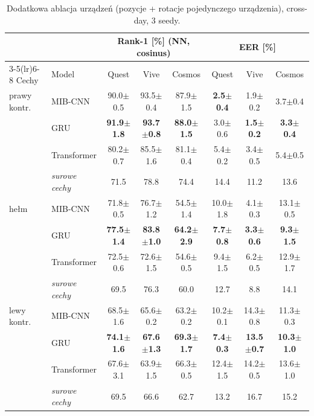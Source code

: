\begin{table}[H]\centering\small
\caption{Dodatkowa ablacja urządzeń (pozycje + rotacje pojedynczego urządzenia), cross-day, 3 seedy.}\label{tab:abl_dev}
\begin{tabular}{llcccccc}
\toprule
 & & \multicolumn{3}{c}{Rank-1 [\%] (NN, cosinus)} & \multicolumn{3}{c}{EER [\%]} \\
\cmidrule(lr){3-5}\cmidrule(lr){6-8}
Cechy & Model & Quest & Vive & Cosmos & Quest & Vive & Cosmos \\
\midrule
prawy kontr. & MIB-CNN & 90.0$\pm$0.5 & 93.5$\pm$0.4 & 87.9$\pm$1.5 & \textbf{2.5$\pm$0.4} & 1.9$\pm$0.2 & 3.7$\pm$0.4 \\
 & GRU & \textbf{91.9$\pm$1.8} & \textbf{93.7$\pm$0.8} & \textbf{88.0$\pm$1.5} & 3.0$\pm$0.6 & \textbf{1.5$\pm$0.2} & \textbf{3.3$\pm$0.4} \\
 & Transformer & 80.2$\pm$0.7 & 85.5$\pm$1.6 & 81.1$\pm$0.4 & 5.4$\pm$0.2 & 3.4$\pm$0.5 & 5.4$\pm$0.5 \\
 & \textit{surowe cechy} & 71.5 & 78.8 & 74.4 & 14.4 & 11.2 & 13.6 \\
\midrule
hełm & MIB-CNN & 71.8$\pm$0.5 & 76.7$\pm$1.2 & 54.5$\pm$1.4 & 10.0$\pm$1.8 & 4.1$\pm$0.3 & 13.1$\pm$0.5 \\
 & GRU & \textbf{77.5$\pm$1.4} & \textbf{83.8$\pm$1.0} & \textbf{64.2$\pm$2.9} & \textbf{7.7$\pm$0.8} & \textbf{3.3$\pm$0.6} & \textbf{9.3$\pm$1.5} \\
 & Transformer & 72.5$\pm$0.6 & 72.6$\pm$1.5 & 54.6$\pm$0.5 & 9.4$\pm$1.5 & 6.2$\pm$0.5 & 12.9$\pm$1.7 \\
 & \textit{surowe cechy} & 69.5 & 76.3 & 60.0 & 12.7 & 8.8 & 14.1 \\
\midrule
lewy kontr. & MIB-CNN & 68.5$\pm$1.6 & 65.6$\pm$0.2 & 63.2$\pm$0.2 & 10.2$\pm$0.1 & 14.3$\pm$0.8 & 11.3$\pm$0.3 \\
 & GRU & \textbf{74.1$\pm$1.6} & \textbf{67.6$\pm$1.3} & \textbf{69.3$\pm$1.7} & \textbf{7.4$\pm$0.3} & \textbf{13.5$\pm$0.7} & \textbf{10.3$\pm$1.0} \\
 & Transformer & 67.6$\pm$3.1 & 63.9$\pm$1.5 & 66.3$\pm$0.5 & 12.4$\pm$1.5 & 14.2$\pm$0.5 & 13.6$\pm$1.0 \\
 & \textit{surowe cechy} & 69.5 & 66.6 & 62.7 & 13.2 & 16.7 & 15.2 \\
\bottomrule
\end{tabular}
\end{table}